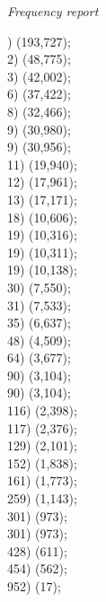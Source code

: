 \normalsize
\begin{center}\textit{Frequency report}\end{center}
\tiny
\begin{multicols}{5}
) \mbox{} (193,727);\\
2) \mbox{} (48,775);\\
3) \mbox{} (42,002);\\
6) \mbox{} (37,422);\\
8) \mbox{} (32,466);\\
9) \mbox{} (30,980);\\
9) \mbox{} (30,956);\\
11) \mbox{} (19,940);\\
12) \mbox{} (17,961);\\
13) \mbox{} (17,171);\\
18) \mbox{} (10,606);\\
19) \mbox{} (10,316);\\
19) \mbox{} (10,311);\\
19) \mbox{} (10,138);\\
30) \mbox{} (7,550);\\
31) \mbox{} (7,533);\\
35) \mbox{} (6,637);\\
48) \mbox{} (4,509);\\
64) \mbox{} (3,677);\\
90) \mbox{} (3,104);\\
90) \mbox{} (3,104);\\
116) \mbox{} (2,398);\\
117) \mbox{} (2,376);\\
129) \mbox{} (2,101);\\
152) \mbox{} (1,838);\\
161) \mbox{} (1,773);\\
259) \mbox{} (1,143);\\
301) \mbox{} (973);\\
301) \mbox{} (973);\\
428) \mbox{} (611);\\
454) \mbox{} (562);\\
952) \mbox{} (17);\\ %
\end{multicols}